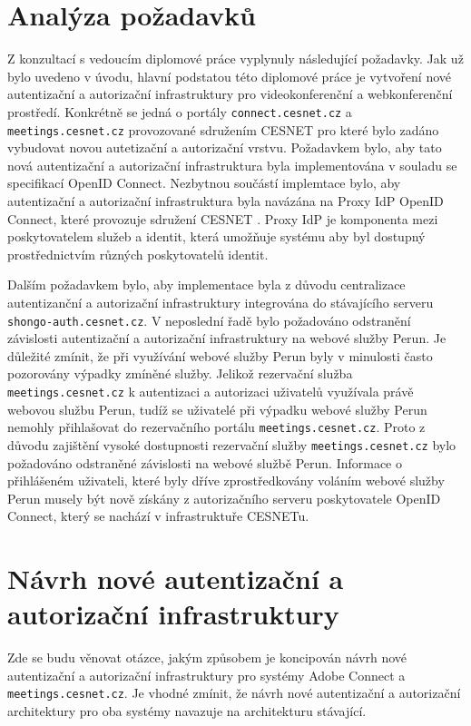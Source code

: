 \documentclass[
  printed, %
  twoside, %
  table,   %
  nolof,     %
  nolot,     %
]{fithesis3}
\begin{document}
\section{Analýza požadavků}
Z konzultací s vedoucím diplomové práce vyplynuly následující požadavky. Jak už bylo uvedeno v úvodu, hlavní podstatou této diplomové práce je vytvoření nové autentizační a autorizační infrastruktury pro videokonferenční a webkonferenční prostředí. Konkrétně se jedná o portály \texttt{connect.cesnet.cz} a \texttt{meetings.cesnet.cz} provozované sdružením CESNET pro které bylo zadáno vybudovat novou autetizační a autorizační vrstvu. Požadavkem bylo, aby tato nová autentizační a autorizační infrastruktura byla implementována v souladu se specifikací OpenID Connect. Nezbytnou součástí implemtace bylo, aby autentizační a autorizační infrastruktura byla navázána na Proxy IdP OpenID Connect, které provozuje sdružení CESNET \cite{proxyIdpPresentation}. Proxy IdP je komponenta mezi poskytovatelem služeb a identit, která umožňuje systému aby byl dostupný prostřednictvím různých poskytovatelů identit. \par

Dalším požadavkem bylo, aby implementace byla z důvodu centralizace autentizanční a autorizační infrastruktury integrována do stávajícího serveru \texttt{shongo-auth.cesnet.cz}. V neposlední řadě bylo požadováno odstranění závislosti autentizační a autorizační infrastruktury na webové služby Perun. Je důležité zmínit, že při využívání webové služby Perun byly v minulosti často pozorovány výpadky zmíněné služby. Jelikož rezervační služba \texttt{meetings.cesnet.cz} k autentizaci a autorizaci uživatelů využívala právě webovou službu Perun, tudíž se uživatelé při výpadku webové služby Perun nemohly přihlašovat do rezervačního portálu \texttt{meetings.cesnet.cz}. Proto z důvodu zajištění vysoké dostupnosti rezervační služby \texttt{meetings.cesnet.cz} bylo požadováno odstraněné závislosti na webové službě Perun. Informace o přihlášeném uživateli, které byly dříve zprostředkovány voláním webové služby Perun musely být nově získány z autorizačního serveru poskytovatele OpenID Connect, který se nachází v infrastruktuře CESNETu.     


\section{Návrh nové autentizační a autorizační infrastruktury}
Zde se budu věnovat otázce, jakým způsobem je koncipován návrh nové autentizační a autorizační infrastruktury pro systémy Adobe Connect a \texttt{meetings.cesnet.cz}. Je vhodné zmínit, že návrh nové autentizační a autorizační architektury pro oba systémy navazuje na architekturu stávající. 
\end{document}
